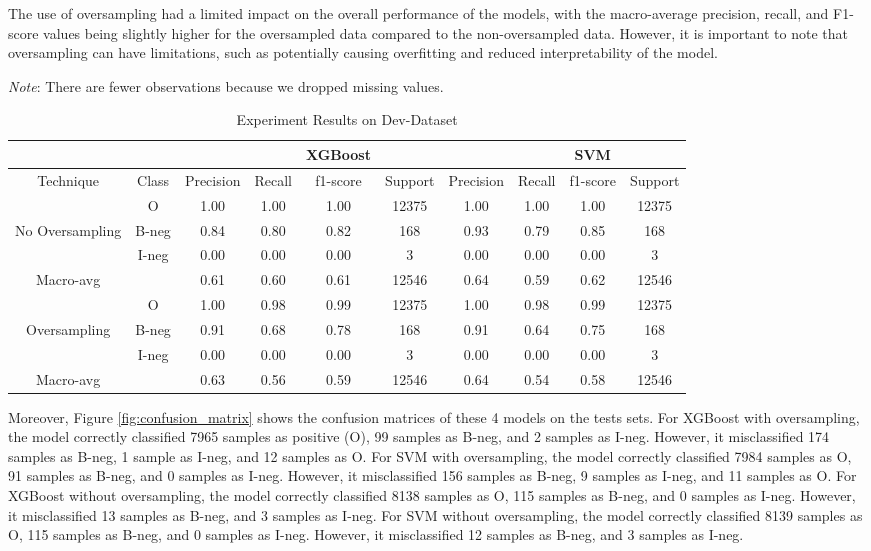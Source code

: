 The use of oversampling had a limited impact on the overall performance of the models, with the macro-average precision, recall, and F1-score values being slightly higher for the oversampled data compared to the non-oversampled data. However, it is important to note that oversampling can have limitations, such as potentially causing overfitting and reduced interpretability of the model. 

\begin{table}[!h]
{\fontsize{9}{4}
\textit{Note}: There are fewer observations because we dropped missing values.}
\centering
\begin{tabular}{cc|cccc|cccc}
\hline
 &  &  &  & XGBoost &  &  &  & SVM &  \\ \hline
Technique & Class & Precision & Recall & f1-score & Support & Precision & Recall & f1-score & Support \\ \hline
 & O & 1.00 & 1.00 & 1.00 & 12375 & 1.00 & 1.00 & 1.00 & 12375 \\
No Oversampling & B-neg & 0.84 & 0.80 & 0.82 & 168 & 0.93 & 0.79 & 0.85 & 168 \\
 & I-neg & 0.00 & 0.00 & 0.00 & 3 & 0.00 & 0.00 & 0.00 & 3 \\
Macro-avg &  & 0.61 & 0.60 & 0.61 & 12546 & 0.64 & 0.59 & 0.62 & 12546 \\ \hline
 & O & 1.00 & 0.98 & 0.99 & 12375 & 1.00 & 0.98 & 0.99 & 12375 \\
Oversampling & B-neg & 0.91 & 0.68 & 0.78 & 168 & 0.91 & 0.64 & 0.75 & 168 \\
 & I-neg & 0.00 & 0.00 & 0.00 & 3 & 0.00 & 0.00 & 0.00 & 3 \\
Macro-avg &  & 0.63 & 0.56 & 0.59 & 12546 & 0.64 & 0.54 & 0.58 & 12546 \\ \hline
\end{tabular}
\caption{Experiment Results on Dev-Dataset}
\label{tab:ResultsonDev-dataset}
\end{table}

Moreover, Figure \ref{fig:confusion_matrix} shows the confusion matrices of these 4 models on the tests sets. For XGBoost with oversampling, the model correctly classified 7965 samples as positive (O), 99 samples as B-neg, and 2 samples as I-neg. However, it misclassified 174 samples as B-neg, 1 sample as I-neg, and 12 samples as O. For SVM with oversampling, the model correctly classified 7984 samples as O, 91 samples as B-neg, and 0 samples as I-neg. However, it misclassified 156 samples as B-neg, 9 samples as I-neg, and 11 samples as O. For XGBoost without oversampling, the model correctly classified 8138 samples as O, 115 samples as B-neg, and 0 samples as I-neg. However, it misclassified 13 samples as B-neg, and 3 samples as I-neg. For SVM without oversampling, the model correctly classified 8139 samples as O, 115 samples as B-neg, and 0 samples as I-neg. However, it misclassified 12 samples as B-neg, and 3 samples as I-neg. 

